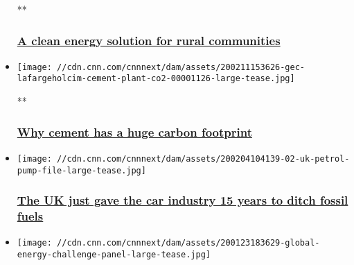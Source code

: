 \begin{itemize}
  **

  \hypertarget{a-clean-energy-solution-for-rural-communities}{%
  \subsubsection{\texorpdfstring{\href{/videos/business/2020/02/25/rural-energy-poverty-gec.cnn-business}{A
  clean energy solution for rural
  communities}}{A clean energy solution for rural communities}}\label{a-clean-energy-solution-for-rural-communities}}
\item
  \href{/videos/energy/2020/02/11/gec-lafargeholcim-cement-plant-co2.cnn}{}

  \texttt{[image: //cdn.cnn.com/cnnnext/dam/assets/200211153626-gec-lafargeholcim-cement-plant-co2-00001126-large-tease.jpg]}

  **

  \hypertarget{why-cement-has-a-huge-carbon-footprint}{%
  \subsubsection{\texorpdfstring{\href{/videos/energy/2020/02/11/gec-lafargeholcim-cement-plant-co2.cnn}{Why
  cement has a huge carbon
  footprint}}{Why cement has a huge carbon footprint}}\label{why-cement-has-a-huge-carbon-footprint}}
\item
  \href{/2020/02/04/business/petrol-and-diesel-ban-uk/index.html}{}

  \texttt{[image: //cdn.cnn.com/cnnnext/dam/assets/200204104139-02-uk-petrol-pump-file-large-tease.jpg]}

  \hypertarget{the-uk-just-gave-the-car-industry-15-years-to-ditch-fossil-fuels}{%
  \subsubsection{\texorpdfstring{\href{/2020/02/04/business/petrol-and-diesel-ban-uk/index.html}{The
  UK just gave the car industry 15 years to ditch fossil
  fuels}}{The UK just gave the car industry 15 years to ditch fossil fuels}}\label{the-uk-just-gave-the-car-industry-15-years-to-ditch-fossil-fuels}}
\item
  \href{/2020/01/23/energy/davos-global-energy-challenge-panel/index.html}{}

  \texttt{[image: //cdn.cnn.com/cnnnext/dam/assets/200123183629-global-energy-challenge-panel-large-tease.jpg]}

  \hypertarget{can-oil-and-gas-companies-help-the-transition-to-clean-energy}{%
}
\end{itemize}
